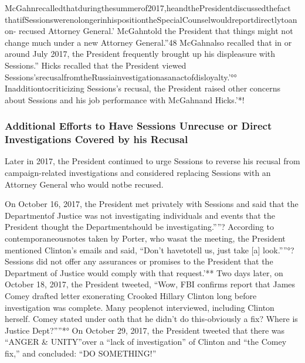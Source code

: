 McGahnrecalledthatduringthesummerof2017,heandthePresidentdiscussedthefact thatifSessionswerenolongerinhispositiontheSpecialCounselwouldreportdirectlytoanon- recused Attorney General.’ McGahntold the President that things might not change much under a new Attorney General.”48 McGahnalso recalled that in or around July 2017, the President frequently brought up his displeasure with Sessions.” Hicks recalled that the President viewed Sessions’srecusalfromtheRussiainvestigationasanactofdisloyalty.’°° Inadditiontocriticizing Sessions’s recusal, the President raised other concerns about Sessions and his job performance with McGahnand Hicks.’*!

\subsubsection{Additional Efforts to Have Sessions Unrecuse or Direct Investigations Covered by his Recusal}

Later in 2017, the President continued to urge Sessions to reverse his recusal from campaign-related investigations and considered replacing Sessions with an Attorney General who would notbe recused.

On October 16, 2017, the President met privately with Sessions and said that the Departmentof Justice was not investigating individuals and events that the President thought the Departmentshould be investigating.””? According to contemporaneousnotes taken by Porter, who wasat the meeting, the President mentioned Clinton’s emails and said, “Don’t havetotell us, just take [a] look.””°? Sessions did not offer any assurances or promises to the President that the Department of Justice would comply with that request.’** Two days later, on October 18, 2017, the President tweeted, “Wow, FBI confirms report that James Comey drafted letter exonerating Crooked Hillary Clinton long before investigation was complete. Many peoplenot interviewed,
including Clinton herself. Comey stated under oath that he didn’t do this-obviously a fix? Where is Justice Dept?””*° On October 29, 2017, the President tweeted that there was “ANGER & UNITY”over a “lack of investigation” of Clinton and “the Comey fix,” and concluded: “DO SOMETHING!”

